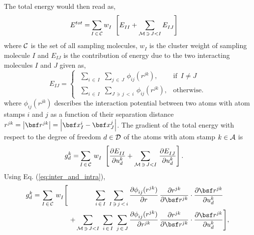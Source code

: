 \documentclass[a4paper,10pt]{article}
\newcommand{\refeq}[1]{Eq. (\ref{eq:#1})}
\newcommand{\norm}[1]{\left\lvert #1 \right\rvert}
\def\mcl  #1{               {\cal #1}}
\begin{document}
The total energy would then read as,
\begin{align}
 E^{tot} = &\sum_{I \, \in \, \mcl C} w^{}_I \,\,
            \left[
		  E^{}_{II} +
		  \sum_{\mcl M \, \ni \, J < I} 
                  E^{}_{IJ} 
            \right]
\end{align}
where $\mcl C$ is the set of all sampling molecules, $w^{}_I$ is the cluster 
weight of sampling molecule $I$ and $E^{}_{IJ}$ is the contribution of energy 
due to the two interacting molecules $I$ and $J$ given as,
\begin{equation}
 E^{}_{IJ} =  \begin{cases}                   \,\,
               \sum\limits_{i \, \in \, I}    \,\,
               \sum\limits_{j \, \in \, J}    \,
		\phi^{}_{ij}(r^{jk}),
		& \text{if } \,  I \neq J \\[1em] \,\,

               \sum\limits_{i \, \in \, I}    \,\,
               \sum\limits_{J \, \ni \, j \, < \, i} \,
               \phi^{}_{ij}(r^{jk}), 
               & \text{otherwise}.
              \end{cases}
\label{eq:inter_and_intra}
\end{equation}
where $\phi^{}_{ij}(r^{jk})$ describes the interaction potential between two 
atoms with atom stamps $i$ and $j$ as a function of their separation distance 
$r^{jk} = \norm{\bsf r^{jk}} = \norm{ \bsf x^{i}_{I} - \bsf x^{j}_{J} }$. 
The gradient of the total energy with respect to the degree of freedom $d \in 
\mcl D$ of the atoms with atom stamp $k \in \mcl A$ is
\begin{align}
 g^k_d = &\sum_{I \, \in \, \mcl C}  \, w^{}_I \,\, 
	  \left[
		\frac{\partial E^{}_{II}}{\partial u^k_d}
		+
		\sum_{\mcl M \, \ni \, J < I}  \,
		\frac{\partial E^{}_{IJ}}{\partial u^k_d}
	   \right].
\end{align}
Using \refeq{inter_and_intra},
\begin{align}
 g^k_d = \sum_{I \, \in \, \mcl C}  \, w^{}_I
          \Bigg[
            \,\,\,\,\,\,\,\,\,\,\,\,\,\,\,\,\,\,\,\,\,\,\,
	    \sum_{i \, \in \, I}                          \,\,
	    \sum_{I \, \ni \, j \, < \, i}                \,
             &\frac{\partial \phi^{}_{ij}(r^{jk})}{\partial r} \, 
               \frac{\partial r^{jk}}{\partial \bsf r^{jk}} \cdot
               \frac{\partial \bsf r^{jk}}{\partial u^k_d}     \\
	    +
	    \sum_{\mcl M \, \ni \, J < I}  \,\,
            \sum_{i \, \in \, I}           \,\,
	    \sum_{j \, \in \, J}           \,
               &\frac{\partial \phi^{}_{ij}(r^{jk})}{\partial r^{jk}} \, 
                 \frac{\partial r^{jk}}{\partial \bsf r^{jk}} \cdot
                 \frac{\partial \bsf r^{jk}}{\partial u^k_d}
           \Bigg],
\end{align}
\end{document}
